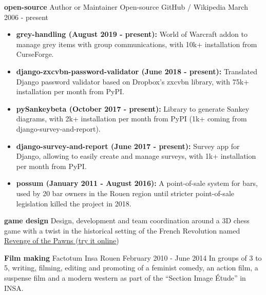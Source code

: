 \documentclass[11pt,a4paper]{moderncv}
\begin{document}
    \cventry
    {\textbf{open-source}}
    {Author or Maintainer}
    {Open-source}
    {GitHub / Wikipedia}
    {March 2006 - present}{
          \begin{itemize}
          \item \textbf{grey-handling (August 2019 - present):} World of Warcraft addon
            to manage grey items with group communications, with 10k+ installation from CurseForge.
          \item \textbf{django-zxcvbn-password-validator (June 2018 - present):} Translated Django password
            validator based on Dropbox's zxcvbn library, with 75k+ installation per month from PyPI.
          \item \textbf{pySankeybeta (October 2017 - present):} Library to generate Sankey diagrams, with
            2k+ installation per month from PyPI (1k+ coming from django-survey-and-report).
          \item \textbf{django-survey-and-report (June 2017 - present):} Survey app for Django,
            allowing to easily create and manage surveys, with 1k+ installation per month from PyPI.
          \item \textbf{possum (January 2011 - August 2016):} A point-of-sale system for bars, used by 20 bar owners in the
            Rouen region until stricter point-of-sale legislation killed the project in 2018.
      \end{itemize}
    }

      \cvline
    {\textbf{game design}}
    {
      Design, development and team coordination around a 3D chess game with a twist in the historical
      setting of the French Revolution named \href{https://discord.gg/jSZGdWYXHY}{Revenge of the Pawns
      \faDiscord} (\href{https://ettin-des-alpes.fr/}{\underline{try it online}})
    }{}{}

    \cventry
    {\textbf{Film making}}
    {Factotum}
    {Insa}
    {Rouen}
    {February 2010 - June 2014}{
      In groups of 3 to 5, writing, filming, editing and promoting of a
      feminist comedy, an action film, a suspense film and a modern western as
      part of the ``Section Image Étude'' in INSA.
    }
\end{document}
